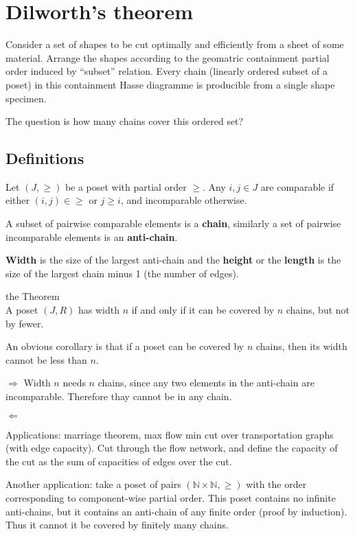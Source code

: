 \section{Dilworth's theorem} %
\label{sec:dilworth_s_theorem}

Consider a set of shapes to be cut optimally and efficiently from a sheet
of some material. Arrange the shapes according to the geomatric containment
partial order induced by ``subset'' relation. Every chain (linearly ordered
subset of a poset) in this containment Hasse diagramme is producible from a
single shape specimen.

The question is how many chains cover this ordered set?

\subsection{Definitions} %
\label{sub:definitions}
Let $(J,\geq)$ be a poset with partial order $\geq$. Any $i,j \in J$ are
comparable if either $(i,j)\in \geq$ or $j\geq i$, and incomparable otherwise.

A subset of pairwise comparable elements is a \textbf{chain}, similarly a set
of pairwise incomparable elements is an \textbf{anti-chain}.

\textbf{Width} is the size of the largest anti-chain and the \textbf{height} or
the \textbf{length} is the size of the largest chain minus 1 (the number of edges).


\noindent the Theorem\hfill\\
A poset $(J,R)$ has width $n$ if and only if it can be covered by $n$ chains,
but not by fewer.

An obvious corollary is that if a poset can be covered by $n$ chains, then its
width cannot be less than $n$.

$\Rightarrow$ Width $n$ needs $n$ chains, since any two elements in the anti-chain
are incomparable. Therefore thay cannot be in any chain.

$\Leftarrow$


Applications: marriage theorem, max flow min cut over transportation graphs
(with edge capacity). Cut through the flow network, and define the capacity
of the cut as the sum of capacities of edges over the cut.

Another application: take a poset of pairs $(\mathbb{N}\times \mathbb{N}, \geq)$
with the order corresponding to component-wise partial order. This poset contains
no infinite anti-chains, but it contains an anti-chain of any finite order (proof
by induction). Thus it cannot it be covered by finitely many chains.



